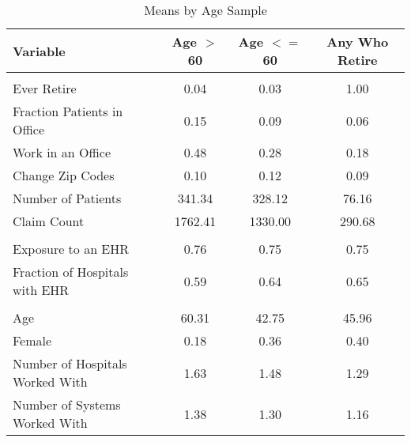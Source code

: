 \begin{table}[h]

\caption{Means by Age Sample}
\centering
\begin{tabular}[t]{lccc}
\toprule
Variable & Age $>$ 60 & Age $<=$ 60 & Any Who Retire\\
\midrule
\addlinespace[0.3em]
\multicolumn{4}{l}{\textbf{Outcomes}}\\
\hspace{1em}Ever Retire & 0.04 & 0.03 & 1.00\\
\hspace{1em}Fraction Patients in Office & 0.15 & 0.09 & 0.06\\
\hspace{1em}Work in an Office & 0.48 & 0.28 & 0.18\\
\hspace{1em}Change Zip Codes & 0.10 & 0.12 & 0.09\\
\hspace{1em}Number of Patients & 341.34 & 328.12 & 76.16\\
\hspace{1em}Claim Count & 1762.41 & 1330.00 & 290.68\\
\addlinespace[0.3em]
\multicolumn{4}{l}{\textbf{Treatment}}\\
\hspace{1em}Exposure to an EHR & 0.76 & 0.75 & 0.75\\
\hspace{1em}Fraction of Hospitals with EHR & 0.59 & 0.64 & 0.65\\
\addlinespace[0.3em]
\multicolumn{4}{l}{\textbf{Characteristics}}\\
\hspace{1em}Age & 60.31 & 42.75 & 45.96\\
\hspace{1em}Female & 0.18 & 0.36 & 0.40\\
\hspace{1em}Number of Hospitals Worked With & 1.63 & 1.48 & 1.29\\
\hspace{1em}Number of Systems Worked With & 1.38 & 1.30 & 1.16\\
\bottomrule
\end{tabular}
\label{tab:splitstats}
\end{table}
